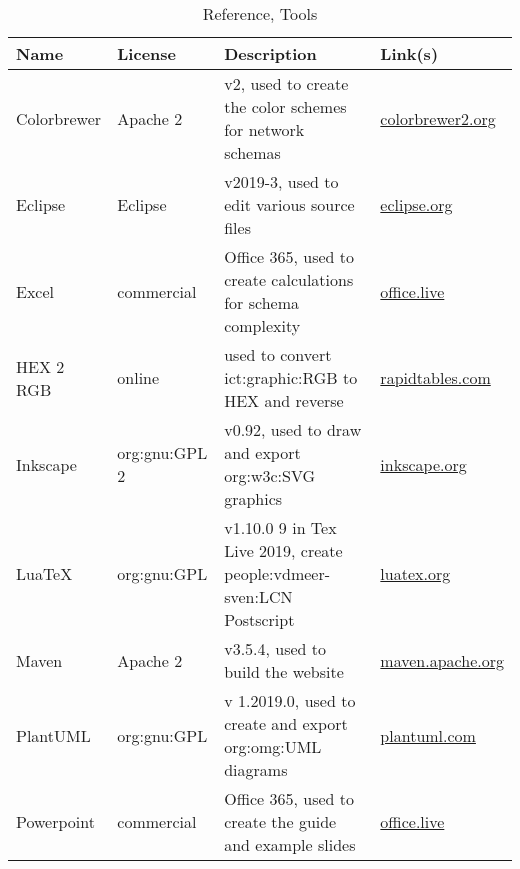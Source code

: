 \begin{table}[H]
    \caption{Reference, Tools}
    \label{tab:ref:ext:tools}
    \centering
    \begin{tabular}{p{} p{} p{} p{}}
        \toprule
        \textbf{Name} & \textbf{License} & \textbf{Description} & \textbf{Link(s)}\\
        \toprule

        Colorbrewer & Apache 2 &
        v2, used to create the color schemes for network schemas &
        \href{http://colorbrewer2.org/#type=sequential&scheme=BuGn&n=9}{colorbrewer2.org}
        \\

        Eclipse & Eclipse &
        v2019-3, used to edit various source files &
        \href{https://www.eclipse.org/}{eclipse.org}
        \\

        Excel & commercial &
        Office 365, used to create calculations for schema complexity &
        \href{https://office.live.com/start/Excel.aspx}{office.live}
        \\

        HEX 2 RGB & online &
        used to convert \acs{ict:graphic:RGB} to HEX and reverse &
        \href{https://www.rapidtables.com/convert/color/hex-to-rgb.html}{rapidtables.com}
        \\

        Inkscape & \acs{org:gnu:GPL} 2 &
        v0.92, used to draw and export \ac{org:w3c:SVG} graphics &
        \href{https://inkscape.org/}{inkscape.org}
        \\

        LuaTeX & \acs{org:gnu:GPL} &
        v1.10.0 9 in Tex Live 2019, create \acs{people:vdmeer-sven:LCN} Postscript &
        \href{http://www.luatex.org/}{luatex.org}
        \\

        Maven & Apache 2 &
        v3.5.4, used to build the website &
        \href{https://maven.apache.org/}{maven.apache.org}
        \\

        PlantUML & \acs{org:gnu:GPL} &
        v 1.2019.0, used to create and export \ac{org:omg:UML} diagrams &
        \href{http://plantuml.com/}{plantuml.com}
        \\

        Powerpoint & commercial &
        Office 365, used to create the guide and example slides &
        \href{https://office.live.com/start/PowerPoint.aspx}{office.live}
        \\


\end{tabular}
\end{table}
